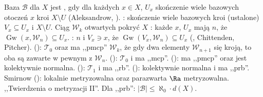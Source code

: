{\color{gray}
Baza  $\mathcal B$ dla $X$ jest , gdy dla każdych $x \in X$, $U_x$ skończenie wiele bazowych otoczeń $x$ kroi $X \setminus U$ (Aleksandrow, ).
: skończenie wiele bazowych kroi (ustalone) $V_x \subseteq U_x$ i $X \setminus U$.
Ciąg $\mathcal W_k$ otwartych pokryć $X$ : każde $x$, $U_x$ mają $n$, że $\operatorname{Gw}(x, \mathcal W_n) \subseteq U_x$.
: $n$ i $V_x \ni x$, że $\operatorname{Gw}(V_x, \mathcal W_n) \subseteq U_x$ (, Chittenden, Pitcher).
 (): $\mathcal T_0$ oraz ma ,,pmcp'' $\mathcal W_k$, że gdy dwa elementy $\mathcal W_{n+1}$ się kroją, to oba są zawarte w pewnym z $\mathcal W_n$.
 (): $\mathcal T_0$ i ma ,,mcp''.
 (): ma ,,pmcp'' oraz jest kolektywnie normalna.
 (): $\mathcal T_1$ i ma ,,rb''.
 (): kolektywnie normalna i ma ,,prb''.
Smirnow (): lokalnie metryzowalna oraz parazwarta $\Ra$ metryzowalna.
,,Twierdzenia o metryzacji II''.
Dla ,,prb'': $|\mathcal B| \le \aleph_0 \cdot d(X)$.
}